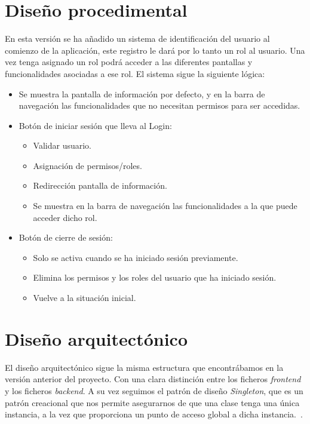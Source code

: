 \section{Diseño procedimental}
En esta versión se ha añadido un sistema de identificación del usuario al comienzo de la aplicación, este registro le dará por lo tanto un rol al usuario. Una vez tenga asignado un rol podrá acceder a las diferentes pantallas y funcionalidades asociadas a ese rol.
El sistema sigue la siguiente lógica:
\begin{itemize}
	\item Se muestra la pantalla de información por defecto, y en la barra de navegación las funcionalidades que no necesitan permisos para ser accedidas.
	\item Botón de iniciar sesión que lleva al Login:
		\begin{itemize}
			\item Validar usuario.
			\item Asignación de permisos/roles.
			\item Redirección pantalla de información.
			\item Se muestra en la barra de navegación las funcionalidades a la que puede acceder dicho rol.
		\end{itemize}
	\item Botón de cierre de sesión:
		\begin{itemize}
			\item Solo se activa cuando se ha iniciado sesión previamente.
			\item Elimina los permisos y los roles del usuario que ha iniciado sesión.
			\item Vuelve a la situación inicial.
		\end{itemize}
\end{itemize}
\section{Diseño arquitectónico}

El diseño arquitectónico sigue la misma estructura que encontrábamos en la versión anterior del proyecto. Con una clara distinción entre los ficheros \emph{frontend} y los ficheros \emph{backend}.
A su vez seguimos el patrón de diseño \emph{Singleton}, que es un patrón creacional que nos permite asegurarnos de que una clase tenga una única instancia, a la vez que proporciona un punto de acceso global a dicha instancia.~\cite{Singleton}.
